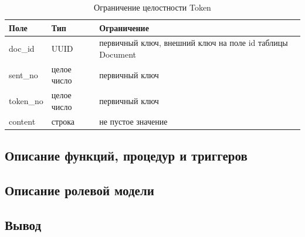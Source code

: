 \begin{table}[H]
\centering
\caption{Ограничение целостности Token}
\begin{tabular}{|m{3cm}|m{3cm}|m{6cm}|}
\hline
\textbf{Поле} & \textbf{Тип} & \textbf{Ограничение} \\ \hline
doc\_id & UUID & первичный ключ, внешний ключ на поле id таблицы Document \\ \hline
sent\_no & целое число & первичный ключ \\ \hline
token\_no & целое число & первичный ключ \\ \hline
content & строка & не пустое значение \\ \hline
\end{tabular}
\label{tab:token}
\end{table}

\subsection{Описание функций, процедур и триггеров}

\subsection{Описание ролевой модели}

\subsection{Вывод}
